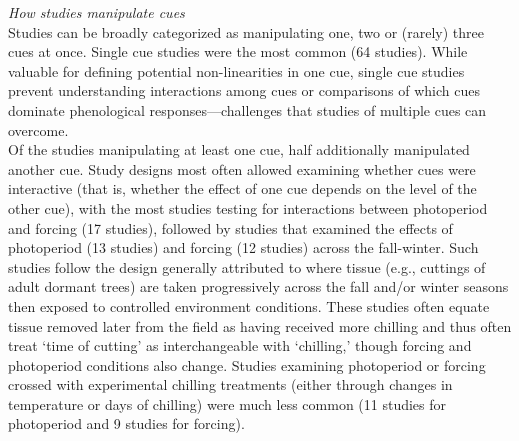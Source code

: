 \documentclass[11pt,letter]{article}
\begin{document}


\emph{How studies manipulate cues}\\
Studies can be broadly categorized as manipulating one, two or (rarely) three cues at once. Single cue studies were the most common (64 studies). While valuable for defining potential non-linearities in one cue, single cue studies prevent understanding interactions among cues or comparisons of which cues dominate phenological responses---challenges that studies of multiple cues can overcome. \\

Of the studies manipulating at least one cue, half additionally manipulated another cue. Study designs most often allowed examining whether cues were interactive (that is, whether the effect of one cue depends on the level of the other cue), with the most studies testing for interactions between photoperiod and forcing (17  studies), followed by studies that examined the effects of photoperiod (13 studies) and forcing (12 studies) across the fall-winter. Such studies follow the design generally attributed to \citet{weinberger1950} where tissue (e.g., cuttings of adult dormant trees) are taken progressively across the fall and/or winter seasons then exposed to controlled environment conditions. These studies often equate tissue removed later from the field as having received more chilling and thus often treat `time of cutting' as interchangeable with `chilling,' though forcing and photoperiod conditions also change. Studies examining photoperiod or forcing crossed with experimental chilling treatments (either through changes in temperature or days of chilling) were much less common (11 studies for photoperiod and 9 studies for forcing). \\
\end{document}
